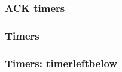 \documentclass{article}
\begin{document}
\subsubsection*{ACK timers}

\begin{chrono}[A,B]
  \testacktimer
\end{chrono}
\hfill
\begin{hchrono}[A,B]
  \testacktimer
\end{hchrono}
\vfill
\begin{chrono}
 \testacktimeri
\end{chrono}
\hfill
\begin{hchrono}
 \testacktimeri
\end{hchrono}
\vfill
\begin{chrono}[A=client,B=serveur]
\testvii
\end{chrono}
\begin{hchrono}[A=client,B=serveur]
\testvii
\end{hchrono}
\vfill
\begin{chrono}[timer time offset=2mm]
\testviii
\end{chrono}
\hfill
\begin{hchrono}
\testviii
\end{hchrono}
\vfill
\begin{chrono}
\testix
\end{chrono}
\hfill
\begin{hchrono}
\testix
\end{hchrono}

\subsubsection*{Timers}

\begin{chrono}[]
\testx
\end{chrono}
\hfill
\begin{chrono}[]
\testxi
\end{chrono}

\begin{hchrono}
\testx
\end{hchrono}

\bigskip

\begin{hchrono}
\testxi
\end{hchrono}
\vfill

\subsubsection*{Timers: timerleftbelow}
\end{document}
